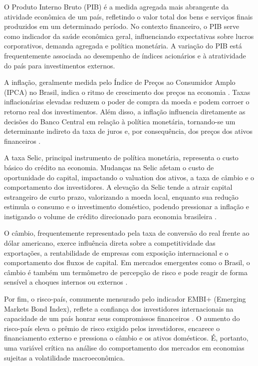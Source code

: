\documentclass[	12pt, Times, openright, oneside, a4paper, english, brazil]{abntex2}
\begin{document}
O Produto Interno Bruto (PIB) é a medida agregada mais abrangente da atividade econômica de um país, refletindo o valor total dos bens e serviços finais produzidos em um determinado período. No contexto financeiro, o PIB serve como indicador da saúde econômica geral, influenciando expectativas sobre lucros corporativos, demanda agregada e política monetária. A variação do PIB está frequentemente associada ao desempenho de índices acionários e à atratividade do país para investimentos externos.

A inflação, geralmente medida pelo Índice de Preços ao Consumidor Amplo (IPCA) no Brasil, indica o ritmo de crescimento dos preços na economia \cite{Carrara2012}. Taxas inflacionárias elevadas reduzem o poder de compra da moeda e podem corroer o retorno real dos investimentos. Além disso, a inflação influencia diretamente as decisões do Banco Central em relação à política monetária, tornando-se um determinante indireto da taxa de juros e, por consequência, dos preços dos ativos financeiros \cite{BCB}.

A taxa Selic, principal instrumento de política monetária, representa o custo básico do crédito na economia. Mudanças na Selic afetam o custo de oportunidade do capital, impactando o valuation dos ativos, a taxa de câmbio e o comportamento dos investidores. A elevação da Selic tende a atrair capital estrangeiro de curto prazo, valorizando a moeda local, enquanto sua redução estimula o consumo e o investimento doméstico, podendo pressionar a inflação e instigando o volume de crédito direcionado para economia brasileira \cite{Pontel2020}.

O câmbio, frequentemente representado pela taxa de conversão do real frente ao dólar americano, exerce influência direta sobre a competitividade das exportações, a rentabilidade de empresas com exposição internacional e o comportamento dos fluxos de capital. Em mercados emergentes como o Brasil, o câmbio é também um termômetro de percepção de risco e pode reagir de forma sensível a choques internos ou externos \cite{Nunes2020}.

Por fim, o risco-país, comumente mensurado pelo indicador EMBI+ (Emerging Markets Bond Index), reflete a confiança dos investidores internacionais na capacidade de um país honrar seus compromissos financeiros \cite{Rodríguez2016}. O aumento do risco-país eleva o prêmio de risco exigido pelos investidores, encarece o financiamento externo e pressiona o câmbio e os ativos domésticos. É, portanto, uma variável crítica na análise do comportamento dos mercados em economias sujeitas a volatilidade macroeconômica.
\end{document}
